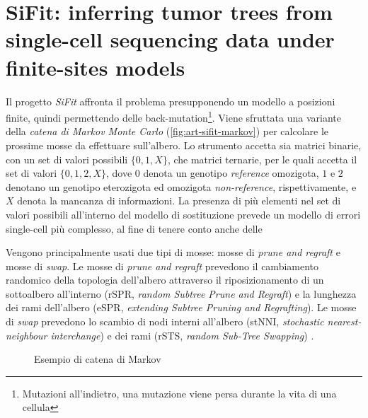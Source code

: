 
\section{SiFit: inferring tumor trees from single-cell sequencing data under finite-sites models \cite{sifit}}
\label{chap:art-sifit}
Il progetto \textit{SiFit} affronta il problema presupponendo un modello a posizioni finite, quindi permettendo delle back-mutation\footnote{Mutazioni all'indietro, una mutazione viene persa durante la vita di una cellula}. Viene sfruttata una variante della \textit{catena di Markov Monte Carlo} (\autoref{fig:art-sifit-markov}) per calcolare le prossime mosse da effettuare sull'albero.
Lo strumento accetta sia matrici binarie, con un set di valori possibili $\{ 0, 1, X \}$, che matrici ternarie, per le quali accetta il set di valori $\{ 0, 1, 2, X \}$, dove $0$ denota un genotipo \textit{reference} omozigota, $1$ e $2$ denotano un genotipo eterozigota ed omozigota \textit{non-reference}, rispettivamente, e $X$ denota la mancanza di informazioni.
La presenza di più elementi nel set di valori possibili all'interno del modello di sostituzione prevede un modello di errori single-cell più complesso, al fine di tenere conto anche delle 

Vengono principalmente usati due tipi di mosse: mosse di \textit{prune and regraft} e mosse di \textit{swap}. Le mosse di \textit{prune and regraft} prevedono il cambiamento randomico della topologia dell'albero attraverso il riposizionamento di un sottoalbero all'interno (rSPR, \textit{random Subtree Prune and Regraft}) e la lunghezza dei rami dell'albero (eSPR, \textit{extending Subtree Pruning and Regrafting}). Le mosse di \textit{swap} prevedono lo scambio di nodi interni all'albero (stNNI, \textit{stochastic nearest-neighbour interchange}) e dei rami (rSTS, \textit{random Sub-Tree Swapping}) \cite{sifit, efficiencymcmc}.

\begin{figure}[h]
    \centering
     \caption{Esempio di catena di Markov}
    \label{fig:art-sifit-markov}
\end{figure}

